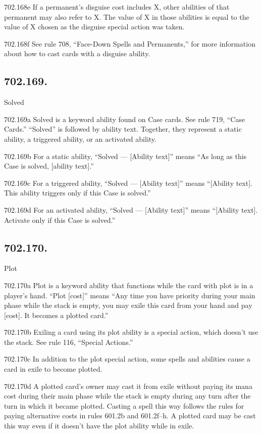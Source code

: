702.168e If a permanent’s disguise cost includes X, other abilities of that permanent may also refer to X. The value of X in those abilities is equal to the value of X chosen as the disguise special action was taken.

702.168f See rule 708, “Face-Down Spells and Permanents,” for more information about how to cast cards with a disguise ability.

\subsection*{702.169.}
Solved

702.169a Solved is a keyword ability found on Case cards. See rule 719, “Case Cards.” “Solved” is followed by ability text. Together, they represent a static ability, a triggered ability, or an activated ability.

702.169b For a static ability, “Solved — [Ability text]” means “As long as this Case is solved, [ability text].”

702.169c For a triggered ability, “Solved — [Ability text]” means “[Ability text]. This ability triggers only if this Case is solved.”

702.169d For an activated ability, “Solved — [Ability text]” means “[Ability text]. Activate only if this Case is solved.”

\subsection*{702.170.}
Plot

702.170a Plot is a keyword ability that functions while the card with plot is in a player’s hand. “Plot [cost]” means “Any time you have priority during your main phase while the stack is empty, you may exile this card from your hand and pay [cost]. It becomes a plotted card.”

702.170b Exiling a card using its plot ability is a special action, which doesn’t use the stack. See rule 116, “Special Actions.”

702.170c In addition to the plot special action, some spells and abilities cause a card in exile to become plotted.

702.170d A plotted card’s owner may cast it from exile without paying its mana cost during their main phase while the stack is empty during any turn after the turn in which it became plotted. Casting a spell this way follows the rules for paying alternative costs in rules 601.2b and 601.2f–h. A plotted card may be cast this way even if it doesn’t have the plot ability while in exile.

